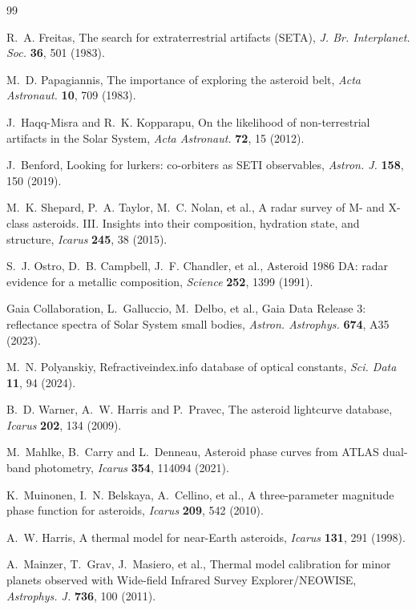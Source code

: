 \documentclass[3p,11pt]{elsarticle}
\begin{document}
\begin{thebibliography}{99}\small\raggedright
\setlength{\itemsep}{1pt}

R.~A. Freitas, The search for extraterrestrial artifacts (SETA), \emph{J. Br. Interplanet.
Soc.} \textbf{36}, 501 (1983).

M.~D. Papagiannis, The importance of exploring the asteroid belt, \emph{Acta Astronaut.}
\textbf{10}, 709 (1983).

J.~Haqq-Misra and R.~K. Kopparapu, On the likelihood of non-terrestrial artifacts in the
Solar System, \emph{Acta Astronaut.} \textbf{72}, 15 (2012).

J.~Benford, Looking for lurkers: co-orbiters as SETI observables, \emph{Astron. J.}
\textbf{158}, 150 (2019).

M.~K. Shepard, P.~A. Taylor, M.~C. Nolan, et al., A radar survey of M- and X-class
asteroids. III. Insights into their composition, hydration state, and structure,
\emph{Icarus} \textbf{245}, 38 (2015).

S.~J. Ostro, D.~B. Campbell, J.~F. Chandler, et al., Asteroid 1986 DA: radar evidence for
a metallic composition, \emph{Science} \textbf{252}, 1399 (1991).

Gaia Collaboration, L.~Galluccio, M.~Delbo, et al., Gaia Data Release 3: reflectance
spectra of Solar System small bodies, \emph{Astron. Astrophys.} \textbf{674}, A35 (2023).

M.~N. Polyanskiy, Refractiveindex.info database of optical constants, \emph{Sci. Data}
\textbf{11}, 94 (2024).

B.~D. Warner, A.~W. Harris and P.~Pravec, The asteroid lightcurve database,
\emph{Icarus} \textbf{202}, 134 (2009).

M.~Mahlke, B.~Carry and L.~Denneau, Asteroid phase curves from ATLAS dual-band
photometry, \emph{Icarus} \textbf{354}, 114094 (2021).

K.~Muinonen, I.~N. Belskaya, A.~Cellino, et al., A three-parameter magnitude phase
function for asteroids, \emph{Icarus} \textbf{209}, 542 (2010).

A.~W. Harris, A thermal model for near-Earth asteroids, \emph{Icarus} \textbf{131}, 291
(1998).

A.~Mainzer, T.~Grav, J.~Masiero, et al., Thermal model calibration for minor planets
observed with Wide-field Infrared Survey Explorer/NEOWISE, \emph{Astrophys. J.}
\textbf{736}, 100 (2011).


\end{thebibliography}
\end{document}
